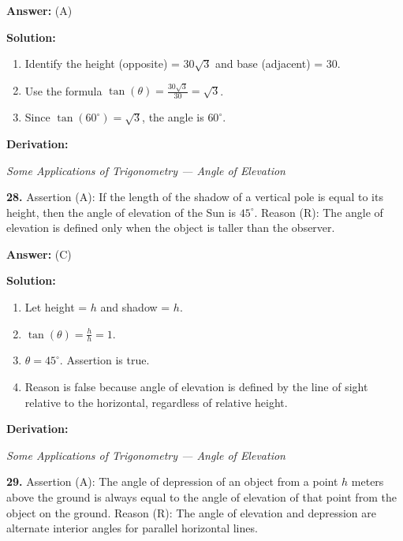 \documentclass[12pt,a4paper]{exam}
\newcommand{\fitmath}[1]{%
  \sbox{\schmathbox}{$\displaystyle #1$}%
  \ifdim\wd\schmathbox>\linewidth
    \resizebox{\linewidth}{!}{\usebox{\schmathbox}}%
  \else
    \usebox{\schmathbox}%
  \fi}
\begin{document}
\begin{questions}
\textbf{Answer:}
(A)

\textbf{Solution:}
\begin{enumerate}
  \item Identify the height (opposite) = $30\sqrt{3}$ and base (adjacent) = $30$.
  \item Use the formula $\tan(\theta) = \frac{30\sqrt{3}}{30} = \sqrt{3}$.
  \item Since $\tan(60^\circ) = \sqrt{3}$, the angle is $60^\circ$.
\end{enumerate}
\textbf{Derivation:}
\begin{center}
\fitmath{\begin{aligned}
\tan(\theta) = \frac{30\sqrt{3}}{30} = \sqrt{3} \\
\implies \theta = 60^\circ
\end{aligned}}
\end{center}
\hfill \textit{Some Applications of Trigonometry — Angle of Elevation}
\vspace{0.3cm}

\question \textbf{28.} Assertion (A): If the length of the shadow of a vertical pole is equal to its height, then the angle of elevation of the Sun is $45^\circ$. 
Reason (R): The angle of elevation is defined only when the object is taller than the observer.

\textbf{Answer:}
(C)

\textbf{Solution:}
\begin{enumerate}
  \item Let height = $h$ and shadow = $h$.
  \item $\tan(\theta) = \frac{h}{h} = 1$.
  \item $\theta = 45^\circ$. Assertion is true.
  \item Reason is false because angle of elevation is defined by the line of sight relative to the horizontal, regardless of relative height.
\end{enumerate}
\textbf{Derivation:}
\begin{center}
\fitmath{\begin{aligned}
\tan(\theta) = \frac{\text{height}}{\text{shadow}} = \frac{h}{h} = 1 \\
\implies \theta = 45^\circ
\end{aligned}}
\end{center}
\hfill \textit{Some Applications of Trigonometry — Angle of Elevation}
\vspace{0.3cm}

\question \textbf{29.} Assertion (A): The angle of depression of an object from a point $h$ meters above the ground is always equal to the angle of elevation of that point from the object on the ground. 
Reason (R): The angle of elevation and depression are alternate interior angles for parallel horizontal lines.


\end{questions}
\end{document}
